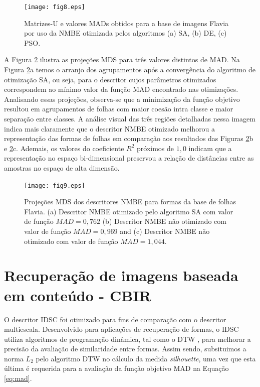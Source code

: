 \begin{figure}[h!] \caption{\label{fig:MatrizU_leaves_II}Matrizes-U e valores MADs obtidos para a base de imagens Flavia por uso da NMBE otimizada pelos algoritmos (a) SA, (b) DE, (c) PSO.}
\centering
\texttt{[image: fig8.eps]}
\end{figure}

A Figura \ref{MDS:Leaves} ilustra as projeções MDS para três valores distintos de MAD. Na Figura \ref{MDS:Leaves}a temos o arranjo dos agrupamentos após a convergência do algoritmo de otimização SA, ou seja, para o descritor cujos parâmetros otimizados correspondem ao mínimo valor da função MAD encontrado nas otimizações. Analisando essas projeções, observa-se que a minimização da função objetivo resultou em agrupamentos de folhas com maior coesão intra classe e maior separação entre classes. A análise visual das três regiões detalhadas  nessa imagem indica mais claramente que o descritor NMBE otimizado melhorou a representação das formas de folhas em comparação aos resultados das Figuras \ref{MDS:Leaves}b e \ref{MDS:Leaves}c. Ademais, os valores do coeficiente $R^2$ próximos de $1,0$ indicam que a representação no espaço bi-dimensional preservou a relação de distâncias entre as amostras no espaço de alta dimensão.

\begin{figure}[t]
 \caption{\label{MDS:Leaves} Projeções MDS dos descritores NMBE para formas da base de folhas Flavia. (a) Descritor NMBE otimizado pelo algoritmo SA com valor de função $MAD = 0,762$ (b) Descritor NMBE não otimizado com valor de função $MAD =0,969$ and (c) Descritor NMBE não otimizado com valor de função $MAD = 1,044$.}

\centering
\texttt{[image: fig9.eps]}
\end{figure}

\section{Recuperação de imagens baseada em conteúdo - CBIR}

O descritor IDSC \cite{Ling:2007:SCU:1191552.1191806} foi otimizado para fins de comparação com o descritor multiescala. Desenvolvido para aplicações de recuperação de formas, o IDSC utiliza algoritmos de programação dinâmica, tal como o DTW \cite{PalazonGonzalez2012978}, para melhorar a precisão da avaliação de similaridade entre formas. Assim sendo, subsituimos a norma $L_2$ pelo algoritmo DTW no cálculo da medida \emph{silhouette}, uma vez que esta última é requerida para a avaliação da função objetivo MAD na Equação \ref{eq:mad}. 

